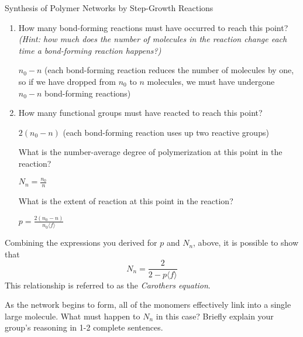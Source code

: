 \begin{activity}[extension]{Synthesis of Polymer Networks by Step-Growth Reactions}
\begin{ctqs}
		\begin{enumerate}
		
			\item How many bond-forming reactions must have occurred to reach this point?  \emph{(Hint: how much does the number of molecules in the reaction change each time a bond-forming reaction happens?)}
			
				\begin{solution}[0.5in]
					$n_0 - n$ (each bond-forming reaction reduces the number of molecules by one, so if we have dropped from $n_0$ to $n$ molecules, we must have undergone $n_0-n$ bond-forming reactions)
				\end{solution}
		
			\item How many functional groups must have reacted to reach this point?
			
				\begin{solution}[0.5in]
					$2(n_0-n)$ (each bond-forming reaction uses up two reactive groups)
				\end{solution}
			
			\question What is the number-average degree of polymerization at this point in the reaction?
			
				\begin{solution}[0.5in]
					$N_n = \frac{n_0}{n}$
				\end{solution}
			
			\question What is the extent of reaction at this point in the reaction?
			
				\begin{solution}[0.5in]
					$p = \frac{2(n_0-n)}{n_0\langle f \rangle}$
				\end{solution}
		
		\end{enumerate}
	
\end{ctqs}

\begin{infobox}
	Combining the expressions you derived for $p$ and $N_n$, above, it is possible to show that
	\begin{equation*}
		N_n = \frac{2}{2-p\langle f \rangle}
	\end{equation*}
	This relationship is referred to as the \emph{Carothers equation}.
\end{infobox}

\begin{ctqs}
	\question As the network begins to form, all of the monomers effectively link into a single large molecule.  What must happen to $N_n$ in this case?  Briefly explain your group's reasoning in 1-2 complete sentences.
	

\end{ctqs}
\end{activity}
